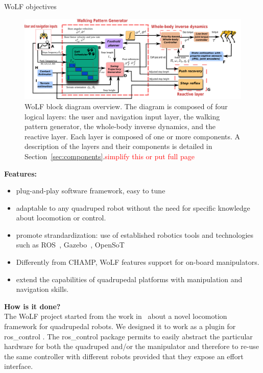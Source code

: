 \begin{myblock}{\large WoLF objectives} 

\begin{figure}
	\centering
	\includegraphics[width=\textwidth]{images/block_diagram_updated.pdf}
	\caption{WoLF block diagram overview. The diagram is composed of four logical layers: the user and navigation input layer, the walking pattern generator, the whole-body inverse dynamics, and the reactive layer. Each layer is composed of one or more components. A description of the layers and their components is detailed in Section~\ref{sec:components}.\textcolor{red}{simplify this or put full page} }
	\label{fig:diagram}
\end{figure}


\textbf{Features:}
\begin{itemize}
	\item plug-and-play software framework, easy to tune 
	\item  adaptable to any quadruped robot without the need for specific knowledge about locomotion or control.	
	\item promote strandardization: use of established robotics tools and technologies such as ROS~\cite{quigley2009ros}, Gazebo~\cite{agueroVRC2015}, OpenSoT~\cite{hoffmanOpenSoT2017} 	
	\item  Differently from CHAMP, WoLF features support for on-board manipulators.
	\item extend the capabilities of quadrupedal platforms with manipulation and navigation skills.
\end{itemize}

\textbf{How is it done?}\\
\vspace{20pt}
The WoLF project started from the work in~\cite{raiola2020} about a novel locomotion framework for quadrupedal robots. 
We designed it to work as a plugin for ros\_control \cite{chitta2017ros_control}. The ros\_control package permits to easily abstract the particular hardware for both the quadruped and/or the manipulator and therefore to re-use the same controller with different robots provided that they expose an effort interface.


\end{myblock}





